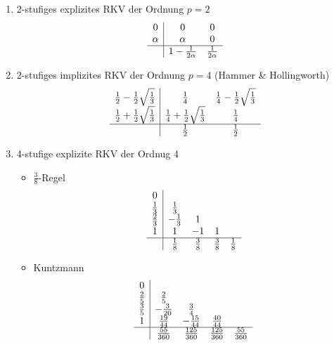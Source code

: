 \begin{example}
	\*
	\begin{enumerate}
		\item 2-stufiges explizites RKV der Ordnung $p=2$
			$$\begin{array}{c|cc}
				0 & 0 & 0\\
				\alpha & \alpha & 0\\
				\hline
				  & 1-\frac{1}{2\alpha} & \frac{1}{2\alpha}
			\end{array}$$
		\item 2-stufiges implizites RKV der Ordnung $p=4$ (Hammer \& Hollingworth)
			$$\begin{array}{c|cc}
				\frac{1}{2} - \frac{1}{2}\sqrt{\frac{1}{3}} & \frac{1}{4} & \frac{1}{4} - \frac{1}{2}\sqrt{\frac{1}{3}}\\
				\frac{1}{2} + \frac{1}{2}\sqrt{\frac{1}{3}} & \frac{1}{4} + \frac{1}{2}\sqrt{\frac{1}{3}} & \frac{1}{4}\\
				\hline
				  & \frac{1}{2} & \frac{1}{2}
			\end{array}$$	
		\item 4-stufige explizite RKV der Ordnug 4
			\begin{itemize} 
				\item $\frac{3}{8}$-Regel
					$$\begin{array}{c|cccc}
						0           &              &             &             & \\
						\frac{1}{3} &  \frac{1}{3} &             &             & \\ 
						\frac{2}{3} & -\frac{1}{3} &           1 &             & \\
						1           &            1 &          -1 &           1 & \\ 
						\hline
						            &  \frac{1}{8} & \frac{3}{8} & \frac{3}{8} & \frac{1}{8}
					\end{array}$$
				\item Kuntzmann
					$$\begin{array}{c|cccc}
						0           &                &                 &                 & \\
						\frac{2}{5} &    \frac{2}{5} &                 &                 & \\ 
						\frac{3}{5} &  -\frac{3}{20} &     \frac{3}{4} &                 & \\
						1           &  \frac{19}{44} &  -\frac{15}{44} &   \frac{40}{44} & \\ 
						\hline
						            & \frac{55}{360} & \frac{125}{360} & \frac{125}{360} & \frac{55}{360}
					\end{array}$$
			
			\end{itemize}
	\end{enumerate}
\end{example}

